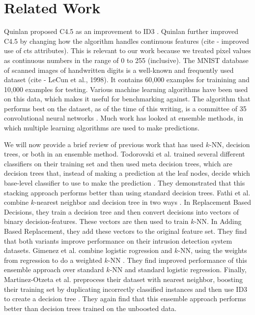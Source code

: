 \section{Related Work}
Quinlan proposed C4.5 as an improvement to ID3 \cite{quinlan2014c4}. Quinlan further improved C4.5 by changing how the algorithm handles continuous features (cite - improved use of cts attributes). This is relevant to our work because we treated pixel values as continuous numbers in the range of 0 to 255 (inclusive). 
The MNIST database of scanned images of handwritten digits is a well-known and frequently used dataset (cite - LeCun et al., 1998). It contains 60,000 examples for trainining and 10,000 examples for testing. Various machine learning algorithms have been used on this data, which makes it useful for benchmarking against. The algorithm that performs best on the dataset, as of the time of this writing, is a committee of 35 convolutional neural networks \cite{cirecsan2010deep}.
Much work has looked at ensemble methods, in which multiple learning algorithms are used to make predictions. 

We will now provide a brief review of previous work that has used $k$-NN, decision trees, or both in an ensemble method. Todorovski et al. trained several different classifiers on their training set and then used meta decision trees, which are decision trees that, instead of making a prediction at the leaf nodes, decide which base-level classifier to use to make the prediction \cite{todorovski2003combining}. They demonstrated that this stacking approach performs better than using standard decision trees.
Fathi et al. combine $k$-nearest neighbor and decision tree in two ways \cite{FathiMazinani}. In Replacement Based Decisions, they train a decision tree and then convert decisions into vectors of binary decision-features. These vectors are then used to train $k$-NN. In Adding Based Replacement, they add these vectors to the original feature set. They find that both variants improve performance on their intrusion detection system datasets.
Gimenez et al. combine logistic rogression and $k$-NN, using the weights from regression to do a weighted $k$-NN \cite{campillo2013improving}. They find improved performance of this ensemble approach over standard $k$-NN and standard logistic regression. Finally, Martinez-Otzeta et al. preprocess their dataset with nearest neighbor, boosting their training set by duplicating incorrectly classified instances and then use ID3 to create a decision tree \cite{martinezk}. They again find that this ensemble approach performs better than decision trees trained on the unboosted data. 

